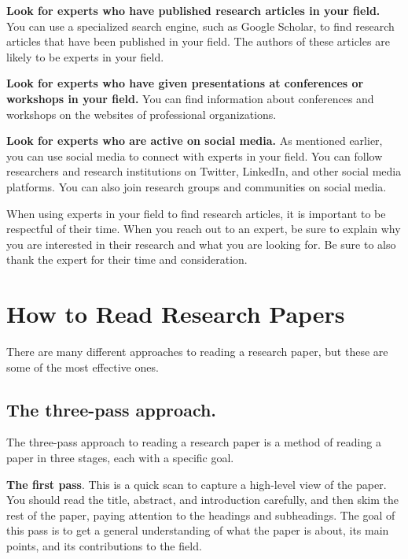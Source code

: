 \documentclass[
  b5paper]{book}
\begin{document}
\textbf{Look for experts who have published research articles in your field.} You can use a specialized search engine, such as Google Scholar, to find research articles that have been published in your field. The authors of these articles are likely to be experts in your field.

\textbf{Look for experts who have given presentations at conferences or workshops in your field.} You can find information about conferences and workshops on the websites of professional organizations.

\textbf{Look for experts who are active on social media.} As mentioned earlier, you can use social media to connect with experts in your field. You can follow researchers and research institutions on Twitter, LinkedIn, and other social media platforms. You can also join research groups and communities on social media.

When using experts in your field to find research articles, it is important to be respectful of their time. When you reach out to an expert, be sure to explain why you are interested in their research and what you are looking for. Be sure to also thank the expert for their time and consideration.

\hypertarget{read}{%
\section{How to Read Research Papers}\label{read}}

There are many different approaches to reading a research paper, but these are some of the most effective ones.

\hypertarget{the-three-pass-approach.}{%
\subsection*{The three-pass approach.}\label{the-three-pass-approach.}}

The three-pass approach to reading a research paper is a method of reading a paper in three stages, each with a specific goal.

\textbf{The first pass}. This is a quick scan to capture a high-level view of the paper. You should read the title, abstract, and introduction carefully, and then skim the rest of the paper, paying attention to the headings and subheadings. The goal of this pass is to get a general understanding of what the paper is about, its main points, and its contributions to the field.
\end{document}

